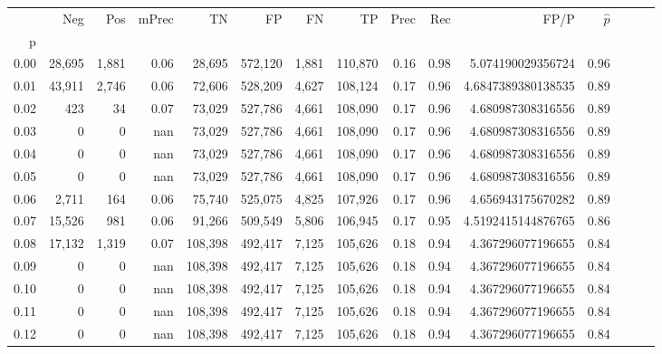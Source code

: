\begin{tabular}{rrrrrrrrrrrrrrr}
\toprule
{} &     Neg &    Pos & mPrec &       TN &       FP &       FN &       TP &  Prec &   Rec &                 FP/P & $\hat{p}$ \\
p    &         &        &       &          &          &          &          &       &       &                      &           \\
\midrule
0.00 &  28,695 &  1,881 &  0.06 &   28,695 &  572,120 &    1,881 &  110,870 &  0.16 &  0.98 &    5.074190029356724 &      0.96 \\
0.01 &  43,911 &  2,746 &  0.06 &   72,606 &  528,209 &    4,627 &  108,124 &  0.17 &  0.96 &   4.6847389380138535 &      0.89 \\
0.02 &     423 &     34 &  0.07 &   73,029 &  527,786 &    4,661 &  108,090 &  0.17 &  0.96 &    4.680987308316556 &      0.89 \\
0.03 &       0 &      0 &   nan &   73,029 &  527,786 &    4,661 &  108,090 &  0.17 &  0.96 &    4.680987308316556 &      0.89 \\
0.04 &       0 &      0 &   nan &   73,029 &  527,786 &    4,661 &  108,090 &  0.17 &  0.96 &    4.680987308316556 &      0.89 \\
0.05 &       0 &      0 &   nan &   73,029 &  527,786 &    4,661 &  108,090 &  0.17 &  0.96 &    4.680987308316556 &      0.89 \\
0.06 &   2,711 &    164 &  0.06 &   75,740 &  525,075 &    4,825 &  107,926 &  0.17 &  0.96 &    4.656943175670282 &      0.89 \\
0.07 &  15,526 &    981 &  0.06 &   91,266 &  509,549 &    5,806 &  106,945 &  0.17 &  0.95 &   4.5192415144876765 &      0.86 \\
0.08 &  17,132 &  1,319 &  0.07 &  108,398 &  492,417 &    7,125 &  105,626 &  0.18 &  0.94 &    4.367296077196655 &      0.84 \\
0.09 &       0 &      0 &   nan &  108,398 &  492,417 &    7,125 &  105,626 &  0.18 &  0.94 &    4.367296077196655 &      0.84 \\
0.10 &       0 &      0 &   nan &  108,398 &  492,417 &    7,125 &  105,626 &  0.18 &  0.94 &    4.367296077196655 &      0.84 \\
0.11 &       0 &      0 &   nan &  108,398 &  492,417 &    7,125 &  105,626 &  0.18 &  0.94 &    4.367296077196655 &      0.84 \\
0.12 &       0 &      0 &   nan &  108,398 &  492,417 &    7,125 &  105,626 &  0.18 &  0.94 &    4.367296077196655 &      0.84 \\

\end{tabular}
